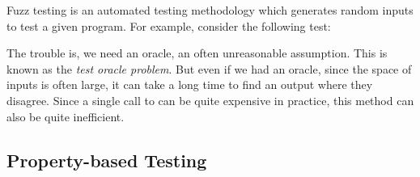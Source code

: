 Fuzz testing is an automated testing methodology which generates random inputs to test a given program. For example, consider the following test:
%
%
The trouble is, we need an oracle, an often unreasonable assumption. This is known as the \textit{test oracle problem}. But even if we had an oracle, since the space of inputs is often large, it can take a long time to find an output where they disagree. Since a single call to  can be quite expensive in practice, this method can also be quite inefficient.

\subsection{Property-based Testing}\label{subsec:property-based-testing}

